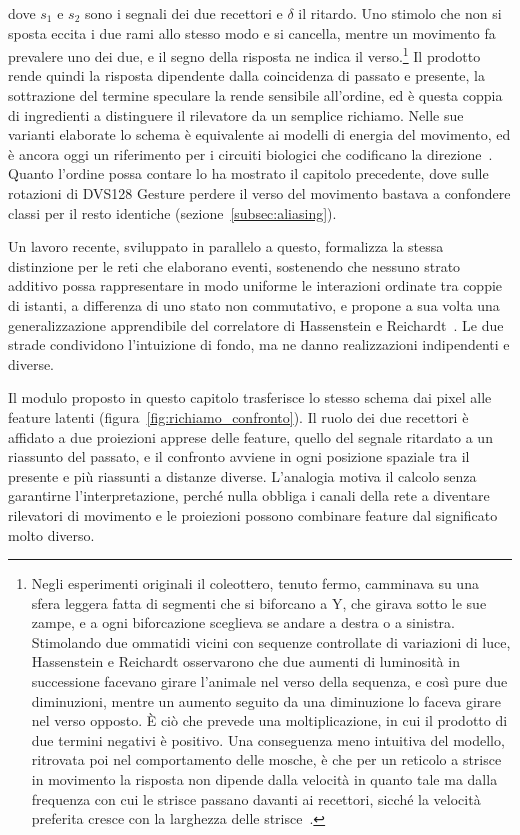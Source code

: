 dove $s_1$ e $s_2$ sono i segnali dei due recettori e $\delta$ il ritardo. Uno stimolo che non si sposta eccita i due rami allo stesso modo e si cancella, mentre un movimento fa prevalere uno dei due, e il segno della risposta ne indica il verso.\footnote{Negli esperimenti originali il coleottero, tenuto fermo, camminava su una sfera leggera fatta di segmenti che si biforcano a Y, che girava sotto le sue zampe, e a ogni biforcazione sceglieva se andare a destra o a sinistra. Stimolando due ommatidi vicini con sequenze controllate di variazioni di luce, Hassenstein e Reichardt osservarono che due aumenti di luminosità in successione facevano girare l'animale nel verso della sequenza, e così pure due diminuzioni, mentre un aumento seguito da una diminuzione lo faceva girare nel verso opposto. È ciò che prevede una moltiplicazione, in cui il prodotto di due termini negativi è positivo. Una conseguenza meno intuitiva del modello, ritrovata poi nel comportamento delle mosche, è che per un reticolo a strisce in movimento la risposta non dipende dalla velocità in quanto tale ma dalla frequenza con cui le strisce passano davanti ai recettori, sicché la velocità preferita cresce con la larghezza delle strisce~\cite{borst2011seeing}.} Il prodotto rende quindi la risposta dipendente dalla coincidenza di passato e presente, la sottrazione del termine speculare la rende sensibile all'ordine, ed è questa coppia di ingredienti a distinguere il rilevatore da un semplice richiamo. Nelle sue varianti elaborate lo schema è equivalente ai modelli di energia del movimento, ed è ancora oggi un riferimento per i circuiti biologici che codificano la direzione~\cite{vansanten1985elaborated,borst2011seeing}. Quanto l'ordine possa contare lo ha mostrato il capitolo precedente, dove sulle rotazioni di DVS128 Gesture perdere il verso del movimento bastava a confondere classi per il resto identiche (sezione~\ref{subsec:aliasing}).

Un lavoro recente, sviluppato in parallelo a questo, formalizza la stessa distinzione per le reti che elaborano eventi, sostenendo che nessuno strato additivo possa rappresentare in modo uniforme le interazioni ordinate tra coppie di istanti, a differenza di uno stato non commutativo, e propone a sua volta una generalizzazione apprendibile del correlatore di Hassenstein e Reichardt~\cite{wang2026learning}. Le due strade condividono l'intuizione di fondo, ma ne danno realizzazioni indipendenti e diverse.

Il modulo proposto in questo capitolo trasferisce lo stesso schema dai pixel alle feature latenti (figura~\ref{fig:richiamo_confronto}). Il ruolo dei due recettori è affidato a due proiezioni apprese delle feature, quello del segnale ritardato a un riassunto del passato, e il confronto avviene in ogni posizione spaziale tra il presente e più riassunti a distanze diverse. L'analogia motiva il calcolo senza garantirne l'interpretazione, perché nulla obbliga i canali della rete a diventare rilevatori di movimento e le proiezioni possono combinare feature dal significato molto diverso.

